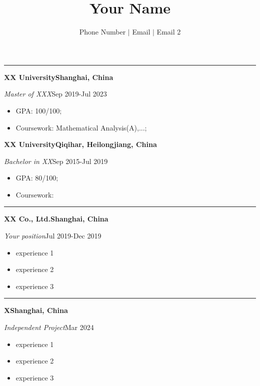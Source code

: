 \documentclass[11pt, a4paper, oneside]{article}
\title{\textbf{Your Name}\vspace{-1em}}
\author{Phone Number $\lvert$ Email $\lvert$ Email 2}
\date{}
\begin{document}
\maketitle
\vspace{-2.4em}

\vspace{-0.5em}
\noindent\rule{\textwidth}{1pt}

\noindent \textbf{XX University}\hfill \textbf{Shanghai, China}

\textit{Master of XXX}\hfill Sep 2019-Jul 2023


\begin{itemize}
	\item GPA: 100/100;
	\item Coursework: Mathematical Analysis(A),...;
\end{itemize}

\noindent \textbf{XX University}\hfill \textbf{Qiqihar, Heilongjiang, China}

\textit{Bachelor in XX}\hfill Sep 2015-Jul 2019

\begin{itemize}
	\item GPA: 80/100;
	\item Coursework: 
\end{itemize}

\vspace{-0.5em}
\noindent\rule{\textwidth}{1pt}

\noindent \textbf{XX Co., Ltd.}\hfill \textbf{Shanghai, China}

\textit{Your position}\hfill Jul 2019-Dec 2019

\begin{itemize}
	\item experience 1
	\item experience 2
	\item experience 3
\end{itemize}

\vspace{-0.5em}
\noindent\rule{\textwidth}{1pt}

\noindent \textbf{X}\hfill \textbf{Shanghai, China}

\textit{Independent Project}\hfill Mar 2024

\begin{itemize}
	\item experience 1
	\item experience 2
	\item experience 3
\end{itemize}
\end{document}
